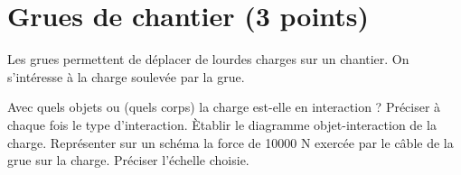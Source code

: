 \section{Grues de chantier (3 points)}\label{grues}

Les grues permettent de déplacer de lourdes charges sur un chantier. On s'intéresse à la charge soulevée par la grue.

\begin{questions}
	\question Avec quels objets ou (quels corps) la charge est-elle en interaction ? Préciser à chaque fois le type d'interaction.
	\question Ètablir le diagramme objet-interaction de la charge.
	\question Représenter sur un schéma la force de \num{10000} N exercée par le câble de la grue sur la charge. Préciser l'échelle choisie.
\end{questions}